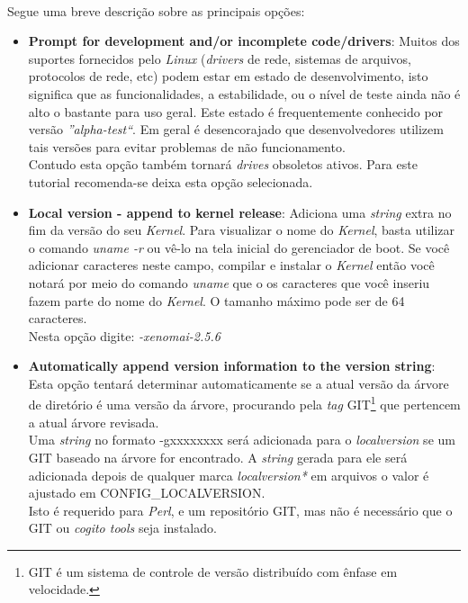 \documentclass[a4paper,10pt]{article}
\begin{document}
    \newpage
    \paragraph{}
    Segue uma breve descrição sobre as principais opções:
      \begin{itemize}
	\item \textbf{Prompt for development and/or incomplete code/drivers}: Muitos dos suportes fornecidos pelo \emph{Linux} 
	      (\emph{drivers} de rede, sistemas de arquivos, protocolos de rede, etc) podem estar em estado de desenvolvimento, isto 
	      significa que as funcionalidades, a estabilidade, ou o nível de teste ainda não é alto o bastante para uso geral. Este 
	      estado é frequentemente conhecido por versão \emph{''alpha-test``}. Em geral é desencorajado que desenvolvedores utilizem 
	      tais versões para evitar problemas de não funcionamento. \\
	      Contudo esta opção também tornará \emph{drives} obsoletos ativos. Para este tutorial recomenda-se deixa esta opção selecionada.
	\item \textbf{Local version - append to kernel release}: Adiciona uma \emph{string} extra no fim da versão do seu \emph{Kernel}. Para  
	      visualizar o nome do \emph{Kernel}, basta utilizar o comando \emph{uname -r } ou vê-lo na tela inicial do gerenciador de boot. 
	      Se você adicionar caracteres neste campo, compilar e instalar o \emph{Kernel} então você notará por meio do comando \emph{uname}
	      que o os caracteres que você inseriu fazem parte do nome do \emph{Kernel}. O tamanho máximo pode ser de 64 caracteres.\\
	      Nesta opção digite: \emph{-xenomai-2.5.6}
	\item \textbf{Automatically append version information to the version string}: Esta opção tentará determinar automaticamente se a 
	      atual versão da árvore de diretório é uma versão da árvore, procurando pela \emph{tag} GIT\footnote{GIT é um sistema de controle 
	      de versão distribuído com ênfase em velocidade. } que pertencem a atual árvore revisada.\\
	      Uma \emph{string} no formato -gxxxxxxxx será adicionada para o \emph{localversion} se um GIT baseado na árvore for encontrado.
	      A \emph{string} gerada para ele será adicionada depois de qualquer marca \emph{localversion*} em arquivos o valor é ajustado em 
	      CONFIG\_LOCALVERSION.\\
	      Isto é requerido para \emph{Perl}, e um repositório GIT, mas não é necessário que o GIT ou \emph{cogito tools} seja instalado.\\

\end{itemize}
\end{document}
